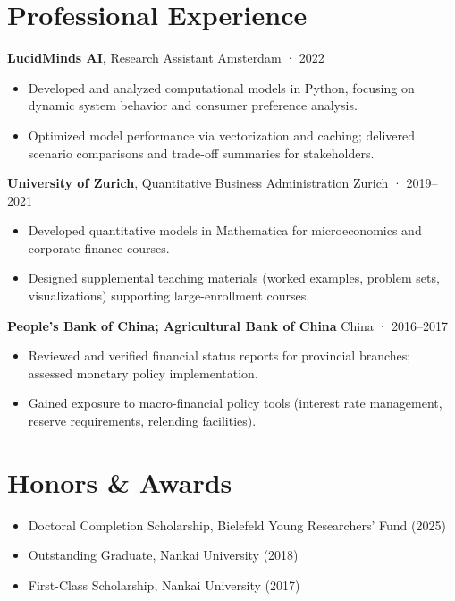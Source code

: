 \documentclass[a4paper,11pt]{article}
\begin{document}
\section{Professional Experience}

\textbf{LucidMinds AI}, Research Assistant \hfill Amsterdam · 2022  
\newline 
\begin{itemize}
\item Developed and analyzed computational models in Python, focusing on dynamic system behavior and consumer preference analysis.
\item Optimized model performance via vectorization and caching; delivered scenario comparisons and trade-off summaries for stakeholders.
\end{itemize}

\textbf{University of Zurich}, Quantitative Business Administration \hfill Zurich · 2019–2021  
\newline 
\begin{itemize}
\item Developed quantitative models in Mathematica for microeconomics and corporate finance courses.  
\item Designed supplemental teaching materials (worked examples, problem sets, visualizations) supporting large-enrollment courses.
\end{itemize}

\textbf{People's Bank of China; Agricultural Bank of China} \hfill China · 2016–2017  
\newline 
\begin{itemize}
\item Reviewed and verified financial status reports for provincial branches; assessed monetary policy implementation.  
\item Gained exposure to macro-financial policy tools (interest rate management, reserve requirements, relending facilities).
\end{itemize}

\section{Honors \& Awards}

\begin{itemize}
\item Doctoral Completion Scholarship, Bielefeld Young Researchers’ Fund (2025)  
\item Outstanding Graduate, Nankai University (2018)  
\item First-Class Scholarship, Nankai University (2017)  
\end{itemize}
\end{document}
